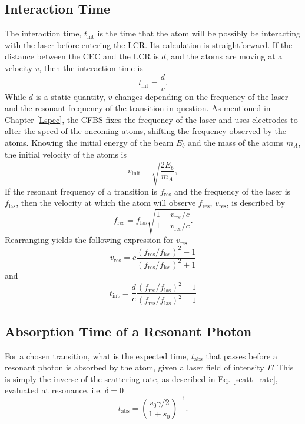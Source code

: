 \subsection{Interaction Time}
The interaction time, $t_{\mathrm{int}}$ is the time that the atom will be possibly be interacting with the laser before entering the LCR. Its calculation is straightforward. If the distance between the CEC and the LCR is $d$, and the atoms are moving at a velocity $v$, then the interaction time is
\begin{equation}
t_{\mathrm{int}} = \frac{d}{v}.
\end{equation}
While $d$ is a static quantity, $v$ changes depending on the frequency of the laser and the resonant frequency of the transition in question. As mentioned in Chapter \ref{Lspec}, the CFBS fixes the frequency of the laser and uses electrodes to alter the speed of the oncoming atoms, shifting the frequency observed by the atoms. Knowing the initial energy of the beam $E_b$ and the mass of the atoms $m_A$, the initial velocity of the atoms is 
\begin{equation}
v_{\mathrm{init}}=\sqrt{\frac{2E_b}{m_A}},
\end{equation}
If the resonant frequency of a transition is $f_{\mathrm{res}}$ and the frequency of the laser is $f_{\mathrm{las}}$, then the velocity at which the atom will observe $f_{\mathrm{res}}$, $v_{\mathrm{res}}$, is described by \cite{cmec}
\begin{equation}
f_{\mathrm{res}} = f_{\mathrm{las}} \sqrt{\frac{1+v_{\mathrm{res}}/c}{1-v_{\mathrm{res}}/c}}.
\end{equation}
Rearranging yields the following expression for $v_{\mathrm{res}}$
\begin{equation}
v_{\mathrm{res}} = c \frac{(f_{\mathrm{res}}/f_{\mathrm{las}})^2-1}{(f_{\mathrm{res}}/f_{\mathrm{las}})^2+1}
\end{equation}
and
\begin{equation}
t_{\mathrm{int}} = \frac{d}{c} \frac{(f_{\mathrm{res}}/f_{\mathrm{las}})^2+1}{(f_{\mathrm{res}}/f_{\mathrm{las}})^2-1}
\end{equation}

\subsection{Absorption Time of a Resonant Photon}
For a chosen transition, what is the expected time, $t_{\mathrm{abs}}$ that passes before a resonant photon is absorbed by the atom, given a laser field of intensity $I$? This is simply the inverse of the scattering rate, as described in Eq. \ref{scatt_rate}, evaluated at resonance, i.e. $\delta = 0$
\begin{equation}
t_{\mathrm{abs}} = \left(\frac{s_0\gamma/2}{1+s_0}\right)^{-1}.
\end{equation}

